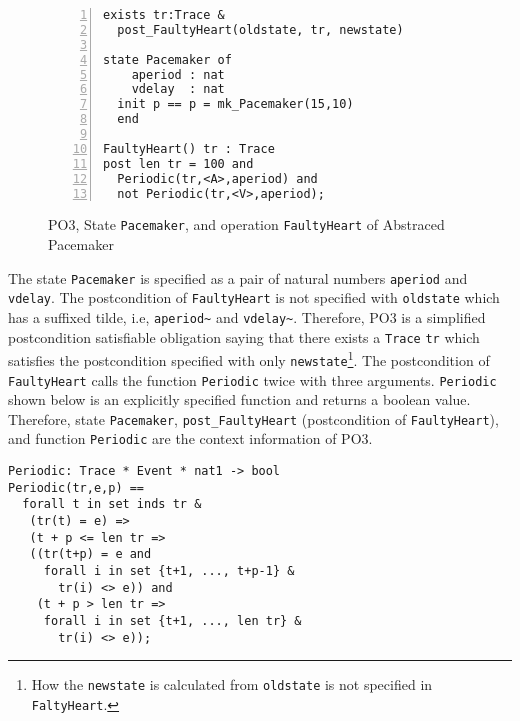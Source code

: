 \begin{figure}[t]
\begin{center}
\begin{mdframed}[roundcorner=5pt]
\begin{Verbatim}[fontsize=\small,numbers=left]
exists tr:Trace &
  post_FaultyHeart(oldstate, tr, newstate)

state Pacemaker of
    aperiod : nat 
    vdelay  : nat
  init p == p = mk_Pacemaker(15,10)
  end

FaultyHeart() tr : Trace
post len tr = 100 and
  Periodic(tr,<A>,aperiod) and 
  not Periodic(tr,<V>,aperiod);
\end{Verbatim}
\end{mdframed}
\vspace{-10pt}
\caption{PO3, State {\tt Pacemaker}, and operation {\tt FaultyHeart} of Abstraced Pacemaker}
\label{fig:po3_case1}
\end{center}
\vspace{-20pt}
\end{figure}

The state {\tt Pacemaker} is specified as a pair of natural numbers {\tt aperiod} and {\tt vdelay}. The postcondition of {\tt FaultyHeart} is not specified with {\tt oldstate} which has a suffixed tilde, i.e, {\tt aperiod\textasciitilde} and {\tt vdelay\textasciitilde}. Therefore, PO3 is a simplified postcondition satisfiable obligation saying that there exists a {\tt Trace} {\tt tr} which satisfies the postcondition specified with only {\tt newstate}\footnote{How the {\tt newstate} is calculated from {\tt oldstate} is not specified in {\tt FaltyHeart}.}. The postcondition of {\tt FaultyHeart} calls the function {\tt Periodic} twice with three arguments. {\tt Periodic} shown below is an explicitly specified function and returns a boolean value. Therefore, state {\tt Pacemaker}, {\tt post\_FaultyHeart} (postcondition of {\tt FaultyHeart}), and function {\tt Periodic} are the context information of PO3. 

\begin{mdframed}[roundcorner=5pt]
\begin{Verbatim}[fontsize=\small]
Periodic: Trace * Event * nat1 -> bool
Periodic(tr,e,p) ==
  forall t in set inds tr &
   (tr(t) = e) =>
   (t + p <= len tr =>
   ((tr(t+p) = e and
     forall i in set {t+1, ..., t+p-1} &
       tr(i) <> e)) and
    (t + p > len tr =>
     forall i in set {t+1, ..., len tr} &
       tr(i) <> e));
\end{Verbatim}
\end{mdframed}

